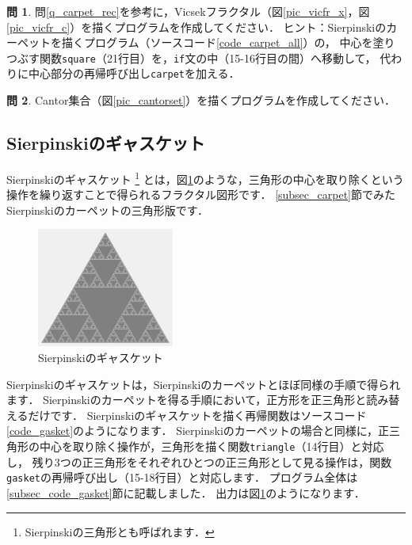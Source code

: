 \documentclass[dvipdfmx]{jsarticle}
\theoremstyle{definition}
\newtheorem{question}{問}[section]
\begin{document}
\begin{question}
    問\ref{q_carpet_rec}を参考に，Vicsekフラクタル（図\ref{pic_vicfr_x}，図\ref{pic_vicfr_c}）を描くプログラムを作成してください．
    ヒント：Sierpinskiのカーペットを描くプログラム（ソースコード\ref{code_carpet_all}）の，
    中心を塗りつぶす関数\texttt{square}（21行目）を，\texttt{if}文の中（15-16行目の間）へ移動して，
    代わりに中心部分の再帰呼び出し\texttt{carpet}を加える．
\end{question}

\begin{question}
    Cantor集合（図\ref{pic_cantorset}）を描くプログラムを作成してください．
\end{question}

\clearpage

\subsection{Sierpinskiのギャスケット}  \label{subsec_gasket}
Sierpinskiのギャスケット
\footnote{
    Sierpinskiの三角形とも呼ばれます．
}
とは，図\ref{pic_gasket}のような，三角形の中心を取り除くという操作を繰り返すことで得られるフラクタル図形です．
\ref{subsec_carpet}節でみたSierpinskiのカーペットの三角形版です．
%
\begin{figure}[H]
    \centering
    \includegraphics[width=0.4\textwidth]{figure/gasket/gasket.png}
    \caption{Sierpinskiのギャスケット}
    \label{pic_gasket}
\end{figure}

Sierpinskiのギャスケットは，Sierpinskiのカーペットとほぼ同様の手順で得られます．
Sierpinskiのカーペットを得る手順において，正方形を正三角形と読み替えるだけです．
Sierpinskiのギャスケットを描く再帰関数はソースコード\ref{code_gasket}のようになります．
Sierpinskiのカーペットの場合と同様に，正三角形の中心を取り除く操作が，三角形を描く関数\verb|triangle|（14行目）と対応し，
残り3つの正三角形をそれぞれひとつの正三角形として見る操作は，関数\verb|gasket|の再帰呼び出し（15-18行目）と対応します．
プログラム全体は\ref{subsec_code_gasket}節に記載しました．
出力は図\ref{pic_gasket}のようになります．
\end{document}
